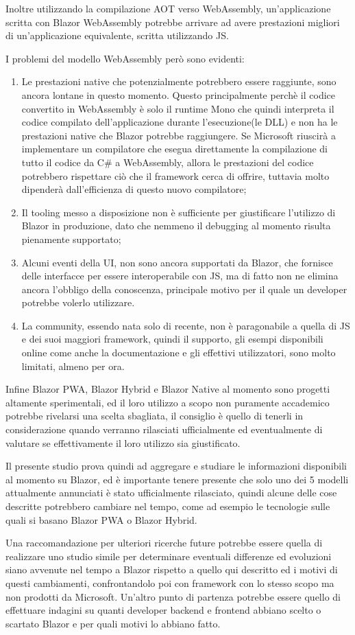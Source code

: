 Inoltre utilizzando la compilazione AOT verso WebAssembly, un'applicazione scritta con Blazor WebAssembly potrebbe arrivare ad avere prestazioni  migliori di un'applicazione equivalente, scritta utilizzando JS.

I problemi del modello WebAssembly per\`o sono evidenti:
\begin{enumerate}
	\item Le prestazioni native che potenzialmente potrebbero essere raggiunte, sono ancora lontane in questo momento.
	Questo principalmente perch\`e il codice convertito in WebAssembly \`e solo il runtime Mono che quindi interpreta il codice compilato dell'applicazione durante l'esecuzione(le DLL) e non ha le prestazioni native che Blazor potrebbe raggiungere.
	Se Microsoft riuscir\`a a implementare un compilatore che esegua direttamente la compilazione di tutto il codice da C\# a WebAssembly, allora le prestazioni del codice potrebbero rispettare ci\`o che il framework cerca di offrire, tuttavia molto dipender\`a dall'efficienza di questo nuovo compilatore;
	\item Il tooling messo a disposizione non \`e sufficiente per giustificare l'utilizzo di Blazor in produzione, dato che nemmeno il debugging al momento risulta pienamente supportato;
	\item Alcuni eventi della UI, non sono ancora supportati da Blazor, che fornisce delle interfacce per essere interoperabile con JS, ma di fatto non ne elimina ancora l'obbligo della conoscenza, principale motivo per il quale un developer potrebbe volerlo utilizzare.
	\item La community, essendo nata solo di recente, non \`e paragonabile a quella di JS e dei suoi maggiori framework, quindi il supporto, gli esempi disponibili online come anche la documentazione e gli effettivi utilizzatori, sono molto limitati, almeno per ora.
\end{enumerate}

Infine Blazor PWA, Blazor Hybrid e Blazor Native al momento sono progetti altamente sperimentali, ed il loro utilizzo a scopo non puramente accademico potrebbe rivelarsi una scelta sbagliata, il consiglio \`e quello di tenerli in considerazione quando verranno rilasciati ufficialmente ed eventualmente di valutare se effettivamente il loro utilizzo sia giustificato.

Il presente studio prova quindi ad aggregare e studiare le informazioni disponibili al momento su Blazor, ed \`e importante tenere presente che solo uno dei 5 modelli attualmente annunciati \`e stato ufficialmente rilasciato, quindi alcune delle cose descritte potrebbero cambiare nel tempo, come ad esempio le tecnologie sulle quali si basano Blazor PWA o Blazor Hybrid.

Una raccomandazione per ulteriori ricerche future potrebbe essere quella di realizzare uno studio simile per determinare eventuali differenze ed evoluzioni siano avvenute nel tempo a Blazor rispetto a quello qui descritto ed i motivi di questi cambiamenti, confrontandolo poi con framework con lo stesso scopo ma non prodotti da Microsoft.
Un'altro punto di partenza potrebbe essere quello di effettuare indagini su quanti developer backend e frontend abbiano scelto o scartato Blazor e per quali motivi lo abbiano fatto.